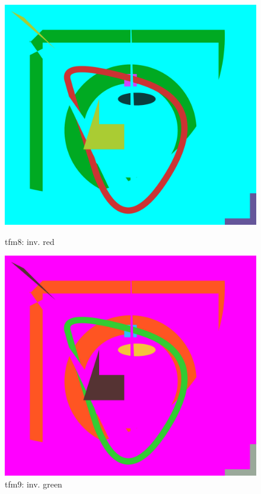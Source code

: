 \documentclass[12pt]{article}
\begin{document}
\begin{figure}[h]
	\centering
	\begin{minipage}[b]{0.3\textwidth}
		\includegraphics[width=\textwidth]{./pdf/main-test-out-8.pdf}
		\caption{tfm8: inv. red}
	\end{minipage}
	\hfill
	\begin{minipage}[b]{0.3\textwidth}
		\includegraphics[width=\textwidth]{./pdf/main-test-out-9.pdf}
		\caption{tfm9: inv. green}

\end{minipage}
\end{figure}
\end{document}
